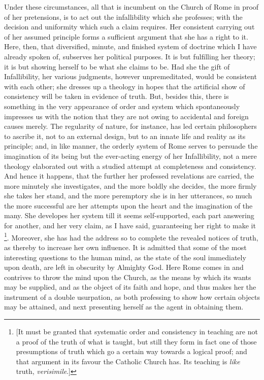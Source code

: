 Under these circumstances, all that is incumbent on the Church of
Rome in proof of her pretensions, is to act out the infallibility
which she professes; with the decision and uniformity which such a
claim requires. Her consistent carrying out of her assumed principle
forms a sufficient argument that she has a right to it. Here,
then, that diversified, minute, and finished system of doctrine which
I have already spoken of, subserves her political purposes. It is but
fulfilling her theory; it is but showing herself to be what she claims
to be. Had she the gift of Infallibility, her various judgments,
however unpremeditated, would be consistent with each other; she
dresses up a theology in hopes that the artificial show of consistency
will be taken in evidence of truth. But, besides this, there is
something in the very appearance of order and system which
spontaneously impresses us with the notion that they are not owing to
accidental and foreign causes merely. The regularity of nature, for
instance, has led certain philosophers to ascribe it, not to an
external design, but to an innate life and reality as its principle;
and, in like manner, the orderly system of Rome serves to persuade the
imagination of its being but the ever-acting energy of her
Infallibility, not a mere theology elaborated out with a studied
attempt at completeness and consistency. And hence it happens, that
the further her professed revelations are carried, the more minutely
she investigates, and the more boldly she decides, the more firmly she
takes her stand, and the more peremptory she is in her utterances, so
much the more successful are her attempts upon the heart and the
imagination of the many. She developes her system till it seems
self-supported, each part answering for another, and her very claim,
as I have said, guaranteeing her right to make it \footnote{[It must be granted that systematic order
and consistency in teaching are not a proof of the truth of what is
taught, but still they form in fact one of those presumptions of truth
which go a certain way towards a logical proof; and that argument in
its favour the Catholic Church has. Its teaching is \emph{like} truth,
\emph{verisimile}.]}. Moreover, she has had the address so to complete the revealed
notices of truth, as thereby to increase her own influence. It is
admitted that some of the most interesting questions to the
human mind, as the state of the soul immediately upon death, are left
in obscurity by Almighty God. Here Rome comes in and contrives to
throw the mind upon the Church, as the means by which its wants may be
supplied, and as the object of its faith and hope, and thus makes her
the instrument of a double usurpation, as both professing to show how
certain objects may be attained, and next presenting herself as the
agent in obtaining them.

